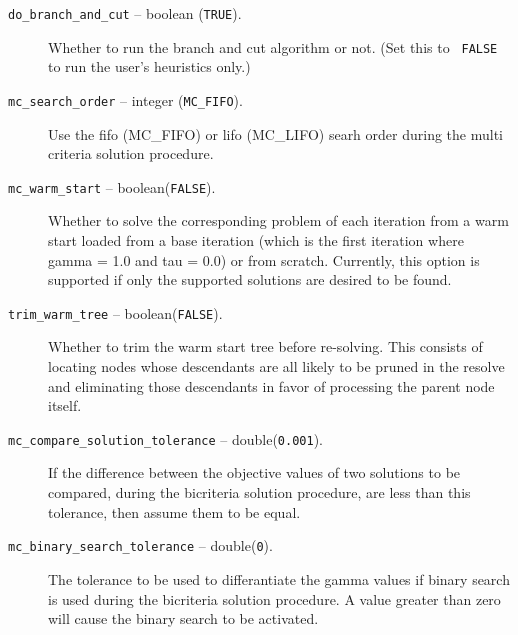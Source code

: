 \begin{description}
\item[{\tt do\_branch\_and\_cut} -- boolean ({\tt TRUE}).]
Whether to run the branch and cut algorithm or not. (Set this to {\tt
FALSE} to run the user's heuristics only.)

\item[{\tt mc\_search\_order} -- integer ({\tt MC\_FIFO}).]
Use the fifo (MC\_FIFO) or lifo (MC\_LIFO) searh order during the multi
criteria solution procedure.

\item[{\tt mc\_warm\_start} -- boolean({\tt FALSE}).]
Whether to solve the corresponding problem of each iteration from a warm 
start loaded from a base iteration (which is the first iteration where 
gamma = 1.0 and tau = 0.0) or from scratch. Currently, this option is 
supported if only the supported solutions are desired to be found.

\item[{\tt trim\_warm\_tree} -- boolean({\tt FALSE}).]
Whether to trim the warm start tree before re-solving. This consists of 
locating nodes whose descendants are all likely to be pruned in the resolve 
and eliminating those descendants in favor of processing the parent node 
itself.

\item[{\tt mc\_compare\_solution\_tolerance} -- double({\tt 0.001}).]
If the difference between the objective values of two solutions to be compared,
during the bicriteria solution procedure, are less than this tolerance, then 
assume them to be equal. 

\item[{\tt mc\_binary\_search\_tolerance} -- double({\tt 0}).]
The tolerance to be used to differantiate the gamma values if binary search 
is used during the bicriteria solution procedure. A value greater than zero
will cause the binary search to be activated.

\end{description}

